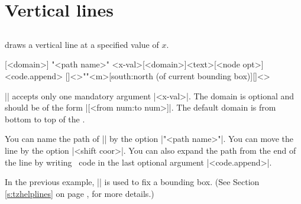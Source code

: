 \section{Vertical lines}
\label{s:tzvfn}

\subsection{\protect\cmd{\tzvfnat}}
\label{ss:tzvfnat}

\icmd{\tzvfnat} draws a vertical line at a specified value of $x$.


\begin{tzdef}{}
[<domain>]
"<path name>"
        {<x-val>}[<domain>]{<text>}[<node opt>]<code.append>
  []<>""{<m>}[south:north (of current bounding box)]{}[]<>
\end{tzdef}

|\tzvfnat| accepts only one mandatory argument |{<x-val>}|.
The domain is optional and should be of the form |[<from num:to num>]|.
The default domain is from bottom to top of the .


\begin{tzcode}{.3}
{}
\end{tzcode}

You can name the path of |\tzvfnat| by the option |"<path name>"|.
You can move the line by the option |<shift coor>|.
You can also expand the path from the end of the line by writing \Tikz\ code in the last optional argument |<code.append>|.

\begin{tzcode}{.3}
\end{tzcode}

In the previous example, |\tzhelplines*| is used to fix a bounding box. (See Section \ref{s:tzhelplines} on page \pageref{s:tzhelplines}, for more details.)



